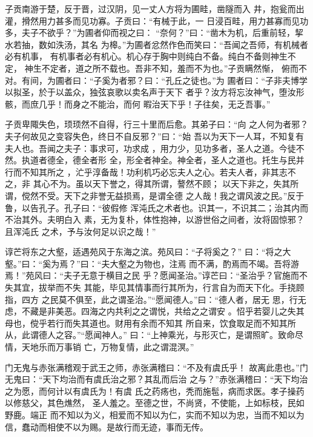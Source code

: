 \documentclass[12pt,UTF8]{ctexbook}
\begin{document}
子贡南游于楚，反于晋，过汉阴，见一丈人方将为圃畦，凿隧而入 井，抱瓮而出灌，搰然用力甚多而见功寡。子贡曰：“有械于此，一 日浸百畦，用力甚寡而见功多，夫子不欲乎？”为圃者仰而视之曰： “奈何？”曰：“凿木为机，后重前轻，挈水若抽，数如泆汤，其名 为槔。”为圃者忿然作色而笑曰：“吾闻之吾师，有机械者必有机事， 有机事者必有机心。机心存于胸中则纯白不备。纯白不备则神生不定， 神生不定者，道之所不载也。吾非不知，羞而不为也。”子贡瞒然惭， 俯而不对。有间，为圃者曰：“子奚为者邪？曰：“孔丘之徒也。”为 圃者曰：“子非夫博学以拟圣，於于以盖众，独弦哀歌以卖名声于天下 者乎？汝方将忘汝神气，堕汝形骸，而庶几乎！而身之不能治，而何 暇治天下乎！子往矣，无乏吾事。”

子贡卑陬失色，顼顼然不自得，行三十里而后愈。其弟子曰：“向 之人何为者邪？夫子何故见之变容失色，终日不自反邪？”曰：“始 吾以为天下一人耳，不知复有夫人也。吾闻之夫子：事求可，功求成 ，用力少，见功多者，圣人之道。今徒不然。执道者德全，德全者形 全，形全者神全。神全者，圣人之道也。托生与民并行而不知其所之 ，汒乎淳备哉！功利机巧必忘夫人之心。若夫人者，非其志不之，非 其心不为。虽以天下誉之，得其所谓，謷然不顾； 以天下非之，失其所谓，傥然不受。天下之非誉无益损焉，是谓全德 之人哉！我之谓风波之民。”反于鲁，以告孔子。孔子曰：“彼假修 浑沌氏之术者也。识其一，不识其二；治其内而不治其外。夫明白入 素，无为复朴，体性抱神，以游世俗之间者，汝将固惊邪？且浑沌氏 之术，予与汝何足以识之哉！”

谆芒将东之大壑，适遇苑风于东海之滨。苑风曰：“子将奚之？” 曰：“将之大壑。”曰：“奚为焉？”曰：“夫大壑之为物也，注焉 而不满，酌焉而不竭。吾将游焉！”苑风曰：“夫子无意于横目之民 乎？愿闻圣治。”谆芒曰：“圣治乎？官施而不失其宜，拔举而不失 其能，毕见其情事而行其所为，行言自为而天下化。手挠顾指，四方 之民莫不俱至，此之谓圣治。”“愿闻德人。”曰：“德人者，居无 思，行无虑，不藏是非美恶。四海之内共利之之谓悦，共给之之谓安 。怊乎若婴儿之失其母也，傥乎若行而失其道也。财用有余而不知其 所自来，饮食取足而不知其所从，此谓德人之容。”“愿闻神人。” 曰：“上神乘光，与形灭亡，是谓照旷。致命尽情，天地乐而万事销 亡，万物复情，此之谓混溟。”

门无鬼与赤张满稽观于武王之师，赤张满稽曰：“不及有虞氏乎！ 故离此患也。”门无鬼曰：“天下均治而有虞氏治之邪？其乱而后治 之与？”赤张满稽曰：“天下均治之为愿，而何计以有虞氏为！有虞 氏之药疡也，秃而施髢，病而求医。孝子操药以修慈父，其色燋然， 圣人羞之。至德之世，不尚贤，不使能，上如标枝，民如野鹿。端正 而不知以为义，相爱而不知以为仁，实而不知以为忠，当而不知以为 信，蠢动而相使不以为赐。是故行而无迹，事而无传。
\end{document}

